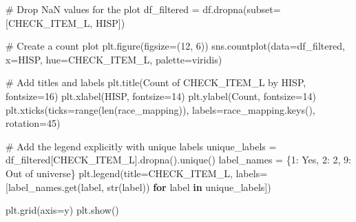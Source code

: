 \documentclass[
  letterpaper,
  DIV=11,
  numbers=noendperiod]{scrreprt}
\newenvironment{Shaded}{\begin{snugshade}}{\end{snugshade}}
\newcommand{\BuiltInTok}[1]{\textcolor[rgb]{0.00,0.23,0.31}{#1}}
\newcommand{\CommentTok}[1]{\textcolor[rgb]{0.37,0.37,0.37}{#1}}
\newcommand{\ControlFlowTok}[1]{\textcolor[rgb]{0.00,0.23,0.31}{\textbf{#1}}}
\newcommand{\DecValTok}[1]{\textcolor[rgb]{0.68,0.00,0.00}{#1}}
\newcommand{\KeywordTok}[1]{\textcolor[rgb]{0.00,0.23,0.31}{\textbf{#1}}}
\newcommand{\NormalTok}[1]{\textcolor[rgb]{0.00,0.23,0.31}{#1}}
\newcommand{\OperatorTok}[1]{\textcolor[rgb]{0.37,0.37,0.37}{#1}}
\newcommand{\StringTok}[1]{\textcolor[rgb]{0.13,0.47,0.30}{#1}}
\begin{document}
\begin{Shaded}
\begin{Highlighting}[]
\CommentTok{\# Drop NaN values for the plot}
\NormalTok{df\_filtered }\OperatorTok{=}\NormalTok{ df.dropna(subset}\OperatorTok{=}\NormalTok{[}\StringTok{\textquotesingle{}CHECK\_ITEM\_L\textquotesingle{}}\NormalTok{, }\StringTok{\textquotesingle{}HISP\textquotesingle{}}\NormalTok{])}

\CommentTok{\# Create a count plot}
\NormalTok{plt.figure(figsize}\OperatorTok{=}\NormalTok{(}\DecValTok{12}\NormalTok{, }\DecValTok{6}\NormalTok{))}
\NormalTok{sns.countplot(data}\OperatorTok{=}\NormalTok{df\_filtered, x}\OperatorTok{=}\StringTok{\textquotesingle{}HISP\textquotesingle{}}\NormalTok{, hue}\OperatorTok{=}\StringTok{\textquotesingle{}CHECK\_ITEM\_L\textquotesingle{}}\NormalTok{, palette}\OperatorTok{=}\StringTok{\textquotesingle{}viridis\textquotesingle{}}\NormalTok{)}

\CommentTok{\# Add titles and labels}
\NormalTok{plt.title(}\StringTok{\textquotesingle{}Count of CHECK\_ITEM\_L by HISP\textquotesingle{}}\NormalTok{, fontsize}\OperatorTok{=}\DecValTok{16}\NormalTok{)}
\NormalTok{plt.xlabel(}\StringTok{\textquotesingle{}HISP\textquotesingle{}}\NormalTok{, fontsize}\OperatorTok{=}\DecValTok{14}\NormalTok{)}
\NormalTok{plt.ylabel(}\StringTok{\textquotesingle{}Count\textquotesingle{}}\NormalTok{, fontsize}\OperatorTok{=}\DecValTok{14}\NormalTok{)}
\NormalTok{plt.xticks(ticks}\OperatorTok{=}\BuiltInTok{range}\NormalTok{(}\BuiltInTok{len}\NormalTok{(race\_mapping)), labels}\OperatorTok{=}\NormalTok{race\_mapping.keys(), rotation}\OperatorTok{=}\DecValTok{45}\NormalTok{)}

\CommentTok{\# Add the legend explicitly with unique labels}
\NormalTok{unique\_labels }\OperatorTok{=}\NormalTok{ df\_filtered[}\StringTok{\textquotesingle{}CHECK\_ITEM\_L\textquotesingle{}}\NormalTok{].dropna().unique()}
\NormalTok{label\_names }\OperatorTok{=}\NormalTok{ \{}\DecValTok{1}\NormalTok{: }\StringTok{\textquotesingle{}Yes\textquotesingle{}}\NormalTok{, }\DecValTok{2}\NormalTok{: }\StringTok{\textquotesingle{}2\textquotesingle{}}\NormalTok{, }\DecValTok{9}\NormalTok{: }\StringTok{\textquotesingle{}Out of universe\textquotesingle{}}\NormalTok{\}}
\NormalTok{plt.legend(title}\OperatorTok{=}\StringTok{\textquotesingle{}CHECK\_ITEM\_L\textquotesingle{}}\NormalTok{, labels}\OperatorTok{=}\NormalTok{[label\_names.get(label, }\BuiltInTok{str}\NormalTok{(label)) }\ControlFlowTok{for}\NormalTok{ label }\KeywordTok{in}\NormalTok{ unique\_labels])}

\NormalTok{plt.grid(axis}\OperatorTok{=}\StringTok{\textquotesingle{}y\textquotesingle{}}\NormalTok{)}
\NormalTok{plt.show()}
\end{Highlighting}
\end{Shaded}
\end{document}
